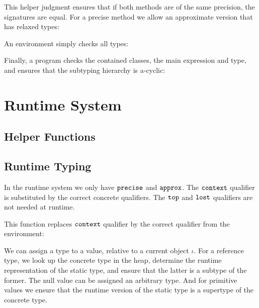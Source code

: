 \ottdefnoverride


This helper judgment ensures that if both methods are of the same
precision, the signatures are equal. For a precise method we allow an
approximate version that has relaxed types:

\ottdefnoverrideaux


An environment simply checks all types:

\ottdefnswfenv


Finally, a program checks the contained classes, the main expression
and type, and ensures that the subtyping hierarchy is a-cyclic:

\ottdefnwfprg



\section{Runtime System}
\label{enerj:rt}

\subsection{Helper Functions}

\ottdefncreation

\ottdefnupdate


\subsection{Runtime Typing}

In the runtime system we only have $ \texttt{\upshape{precise}\,\!} $ and $ \texttt{\upshape{approx}\,\!} $.
The $ \texttt{\upshape{context}\,\!} $ qualifier is substituted by the correct concrete
qualifiers.
The $ \texttt{\upshape{top}\,\!} $ and $ \texttt{\upshape{lost}\,\!} $ qualifiers are not needed at runtime.

This function replaces $ \texttt{\upshape{context}\,\!} $ qualifier by the correct
qualifier from the environment:

\ottdefnsTXXrT


We can assign a type to a value, relative to a current object
$\iota$.
For a reference type, we look up the concrete type in the heap,
determine the runtime representation of the static type, and ensure
that the latter is a subtype of the former.
The null value can be assigned an arbitrary type.
And for primitive values we ensure that the runtime version of the
static type is a supertype of the concrete type.

\ottdefnrttyping


